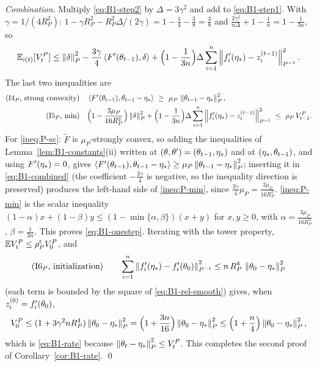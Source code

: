 \emph{Combination.} Multiply \eqref{eq:B1-step2} by $\Delta=3\gamma^2$ and add to \eqref{eq:B1-step1}.
With $\gamma=1/(4R_P^2)$: $1-\gamma R_P^2-R_P^2\Delta/(2\gamma)=1-\frac14-\frac38=\frac38$ and
$\frac{2\gamma^2}{n\Delta}+1-\frac1n=1-\frac1{3n}$, so
\begin{equation}\label{eq:B1-combined}
\mathbb{E}_{i(t)}[V_t^P]\le\left\|\delta\right\|_P^2-\frac{3\gamma}{4}\left\langle F'(\theta_{t-1}), \delta \right\rangle
+\Big(1-\frac1{3n}\Big)\Delta\sum_{i=1}^n\left\|f'_i(\eta_\ast)-z_i^{(t-1)}\right\|_{P^{-1}}^2 .
\end{equation}
The last two inequalities are
\begin{align}
\text{(I4$_P$, strong convexity)}\quad&
\inner{\Fp(\theta_{t-1})}{\theta_{t-1}-\etastar}\ \ge\ \mu_P\,\norm{\theta_{t-1}-\etastar}_P^2,
\label{ineq:P-sc}\\
\text{(I5$_P$, min)}\quad&
\Big(1-\frac{3\mu_P}{16R_P^2}\Big)\norm{\delta}_P^2
+\Big(1-\frac1{3n}\Big)\Delta\sum_{i=1}^n\norm{\fip(\etastar)-z_i^{(t-1)}}_{P^{-1}}^2\ \le\ \rho_P\,V_{t-1}^P .
\label{ineq:P-min}
\end{align}
For \eqref{ineq:P-sc}: $\tilde F$ is $\mu_P$-strongly convex, so adding the inequalities of
Lemma~\ref{lem:B1-constants}(ii) written at $(\theta,\theta')=(\theta_{t-1},\eta_\ast)$ and at
$(\eta_\ast,\theta_{t-1})$, and using $F'(\eta_\ast)=0$, gives
$\left\langle F'(\theta_{t-1}), \theta_{t-1}-\eta_\ast \right\rangle\ge\mu_P\left\|\theta_{t-1}-\eta_\ast\right\|_P^2$; inserting it in
\eqref{eq:B1-combined} (the coefficient $-\frac{3\gamma}4$ is negative, so the inequality direction is
preserved) produces the left-hand side of \eqref{ineq:P-min}, since $\frac{3\gamma}{4}\mu_P=\frac{3\mu_P}{16R_P^2}$.
\eqref{ineq:P-min} is the scalar inequality $(1-\alpha)x+(1-\beta)y\le(1-\min\{\alpha,\beta\})(x+y)$ for
$x,y\ge0$, with $\alpha=\frac{3\mu_P}{16R_P^2}$, $\beta=\frac1{3n}$. This proves \eqref{eq:B1-onestep}.
Iterating with the tower property, $\mathbb{E} V_t^P\le\rho_P^tV_0^P$, and
\begin{equation}\label{ineq:P-init}
\text{(I6$_P$, initialization)}\qquad
\sum_{i=1}^n\left\|f'_i(\eta_\ast)-f'_i(\theta_0)\right\|_{P^{-1}}^2\le n\,R_P^4\,\left\|\theta_0-\eta_\ast\right\|_P^2
\end{equation}
(each term is bounded by the square of \eqref{eq:B1-rel-smooth}) gives, when $z_i^{(0)}=f'_i(\theta_0)$,
\[
V_0^P\le(1+3\gamma^2nR_P^4)\left\|\theta_0-\eta_\ast\right\|_P^2=\Big(1+\frac{3n}{16}\Big)\left\|\theta_0-\eta_\ast\right\|_P^2
\le\Big(1+\frac n4\Big)\left\|\theta_0-\eta_\ast\right\|_P^2 ,
\]
which is \eqref{eq:B1-rate} because
$\left\|\theta_t-\eta_\ast\right\|_P^2\le V_t^P$. This completes the second proof of
Corollary~\ref{cor:B1-rate}. \qed

